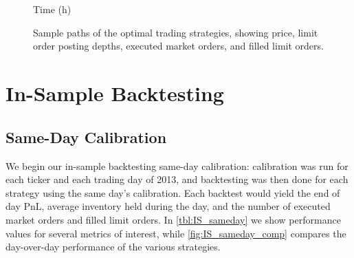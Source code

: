 \begin{figure}
\centering
\begin{subfigure}{.45\linewidth}
  \centering
  \setlength\figureheight{\linewidth} 
  \setlength\figurewidth{\linewidth}
  
\end{subfigure}%
\hfill%
\begin{subfigure}{.45\linewidth}
  \centering
  \setlength\figureheight{\linewidth} 
  \setlength\figurewidth{\linewidth}
   
\end{subfigure}\\
\vspace{1cm}
\begin{subfigure}{.45\linewidth}
  \centering
  \setlength\figureheight{\linewidth} 
  \setlength\figurewidth{\linewidth}
  
\end{subfigure}%
\hfill%
\begin{subfigure}{.45\linewidth}
  \centering
  \setlength\figureheight{\linewidth} 
  \setlength\figurewidth{\linewidth}
   
\end{subfigure}\\
\leavevmode{}\hspace{0pt plus 1filll}\null

Time (h)

\vspace{1cm}%
  \caption{Sample paths of the optimal trading strategies, showing price, limit order posting depths, executed market orders, and filled limit orders.}
  \label{fig:samplepath_inv}
\end{figure}

\FloatBarrier
\section{In-Sample Backtesting}

\subsection{Same-Day Calibration}
We begin our in-sample backtesting same-day calibration: calibration was run for each ticker and each trading day of 2013, and backtesting was then done for each strategy using the same day's calibration. Each backtest would yield the end of day PnL, average inventory held during the day, and the number of executed market orders and filled limit orders. In \autoref{tbl:IS_sameday} we show performance values for several metrics of interest, while \autoref{fig:IS_sameday_comp} compares the day-over-day performance of the various strategies. 

